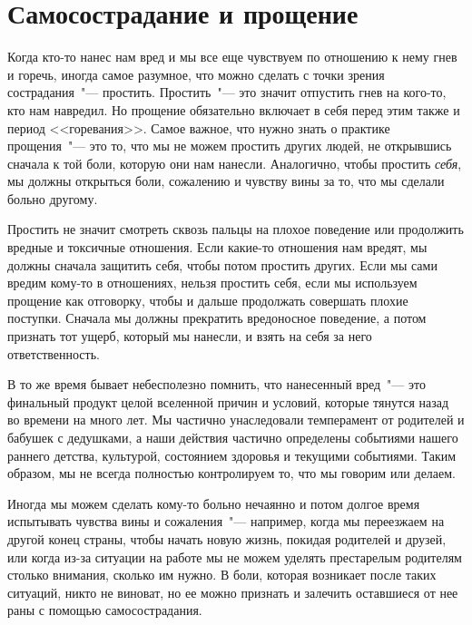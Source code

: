 
\chapter{Самосострадание и прощение} \label{Self-Compassion_and_Forgiveness}

Когда кто-то нанес нам вред и мы все еще чувствуем по отношению к нему гнев и горечь, иногда самое разумное, что можно сделать с точки зрения сострадания~"--- простить. Простить~"--- это значит отпустить гнев на кого-то, кто нам навредил. Но прощение обязательно включает в себя перед этим также и период <<горевания>>. Самое важное, что нужно знать о практике прощения~"--- это то, что мы не можем простить других людей, не открывшись сначала к той боли, которую они нам нанесли. Аналогично, чтобы простить \emph{себя}, мы должны открыться боли, сожалению и чувству вины за то, что мы сделали больно другому. 

Простить не значит смотреть сквозь пальцы на плохое поведение или продолжить вредные и токсичные отношения. Если какие-то отношения нам вредят, мы должны сначала защитить себя, чтобы потом простить других. Если мы сами вредим кому-то в отношениях, нельзя простить себя, если мы используем прощение как отговорку, чтобы и дальше продолжать совершать плохие поступки. Сначала мы должны прекратить вредоносное поведение, а потом признать тот ущерб, который мы нанесли, и взять на себя за него ответственность. 

В то же время бывает небесполезно помнить, что нанесенный вред~"--- это финальный продукт целой вселенной причин и условий, которые тянутся назад во времени на много лет. Мы частично унаследовали темперамент от родителей и бабушек с дедушками, а наши действия частично определены событиями нашего раннего детства, культурой, состоянием здоровья и текущими событиями. Таким образом, мы не всегда полностью контролируем то, что мы говорим или делаем. 

Иногда мы можем сделать кому-то больно нечаянно и потом долгое время испытывать чувства вины и сожаления~"--- например, когда мы переезжаем на другой конец страны, чтобы начать новую жизнь, покидая родителей и друзей, или когда из-за ситуации на работе мы не можем уделять престарелым родителям столько внимания, сколько им нужно. В боли, которая возникает после таких ситуаций, никто не виноват, но ее можно признать и залечить оставшиеся от нее раны с помощью самосострадания. 

